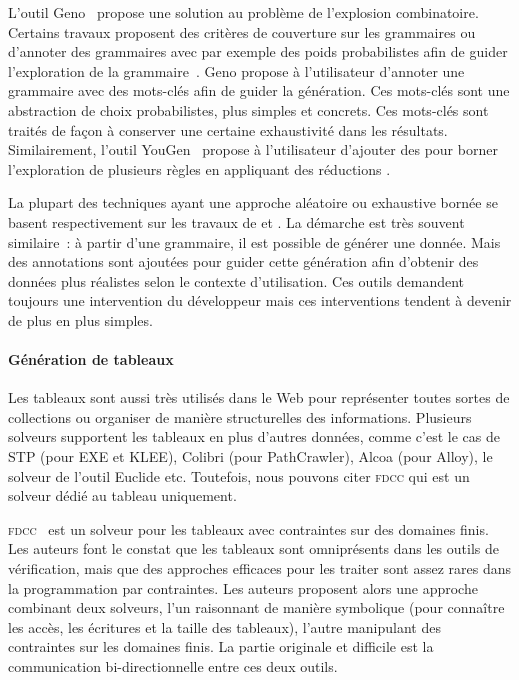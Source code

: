 L'outil Geno~ propose une solution au problème de l'explosion
combinatoire. Certains travaux proposent des critères de couverture sur les
grammaires ou d'annoter des grammaires avec par exemple des poids probabilistes
afin de guider l'exploration de la grammaire~. Geno propose à l'utilisateur d'annoter une grammaire avec
des mots-clés afin de guider la génération. Ces mots-clés sont une abstraction
de choix probabilistes,  plus simples et concrets. Ces
mots-clés sont traités de façon à conserver une certaine exhaustivité dans les
résultats. Similairement, l'outil YouGen~ propose à
l'utilisateur d'ajouter des  pour borner l'exploration de
plusieurs règles en appliquant des réductions .

La plupart des techniques ayant une approche aléatoire ou exhaustive bornée se
basent respectivement sur les travaux de  et
. La démarche est très souvent similaire~: à partir d'une
grammaire, il est possible de générer une donnée. Mais des annotations sont
ajoutées pour guider cette génération afin d'obtenir des données plus réalistes
selon le contexte d'utilisation. Ces outils demandent toujours une intervention
du développeur mais ces interventions tendent à devenir de plus en plus simples.

\paragraph{Génération de tableaux} Les tableaux sont aussi très utilisés dans le
Web pour représenter toutes sortes de collections ou organiser de manière
structurelles des informations. Plusieurs solveurs supportent les tableaux en
plus d'autres données, comme c'est le cas de STP (pour EXE et KLEE), Colibri
(pour PathCrawler), Alcoa (pour Alloy), le solveur de l'outil Euclide etc.
Toutefois, nous pouvons citer {\scshape fdcc} qui est un solveur dédié au
tableau uniquement.

{\scshape fdcc}~ est un solveur pour les tableaux avec
contraintes sur des domaines finis. Les auteurs font le constat que les tableaux
sont omniprésents dans les outils de vérification, mais que des approches
efficaces pour les traiter sont assez rares dans la programmation par
contraintes. Les auteurs proposent alors une approche combinant deux solveurs,
l'un raisonnant de manière symbolique (pour connaître les accès, les écritures
et la taille des tableaux), l'autre manipulant des contraintes sur les domaines
finis. La partie originale et difficile est la communication bi-directionnelle
entre ces deux outils.

